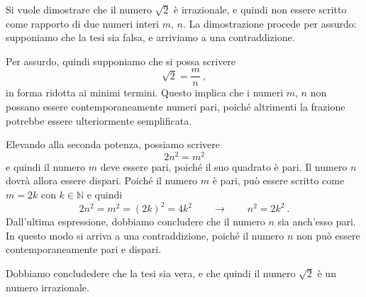 \begin{example} Si vuole dimostrare che il numero $\sqrt{2}$ è irrazionale, e quindi non essere scritto come rapporto di due numeri interi $m$, $n$. La dimostrazione procede per assurdo: supponiamo che la tesi sia falsa, e arriviamo a una contraddizione.

Per assurdo, quindi supponiamo che si possa scrivere
\begin{equation}
\sqrt{2} = \dfrac{m}{n} \ ,
\end{equation}
in forma ridotta ai minimi termini. Questo implica che i numeri $m$, $n$ non possano essere contemporaneamente numeri pari, poiché altrimenti la frazione potrebbe essere ulteriormente semplificata.

Elevando alla seconda potenza, possiamo scrivere
\begin{equation}
  2 n^2 = m^2
\end{equation}
e quindi il numero $m$ deve essere pari, poiché il suo quadrato è pari. Il numero $n$ dovrà allora essere dispari.
Poiché il numero $m$ è pari, può essere scritto come $m = 2k$ con $k \in \mathbb{N}$ e quindi
\begin{equation}
  2 n^2 = m^2 = (2k)^2 = 4 k^2 \qquad \rightarrow \qquad n^2 = 2 k^2 \ .
\end{equation}
Dall'ultima espressione, dobbiamo concludere che il numero $n$ sia anch'esso pari. In questo modo si arriva a una contraddizione, poiché il numero $n$ non può essere contemporaneamente pari e dispari.

Dobbiamo concludedere che la tesi sia vera, e che quindi il numero $\sqrt{2}$ è un numero irrazionale.
\end{example}

